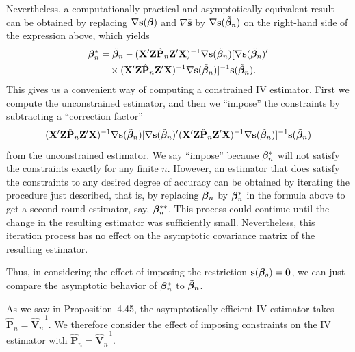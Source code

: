 Nevertheless, a computationally practical and asymptotically equivalent
result can be obtained by replacing $\nabla \mathbf{s}(\boldsymbol{\beta})$ and $\nabla \bar{\mathbf{s}}$ by $\nabla \mathbf{s}(\tilde{\boldsymbol{\beta}}_n)$ on the right-hand side of the expression above, which yields
\begin{align*}
\boldsymbol{\beta}_n^* &= \tilde{\boldsymbol{\beta}}_n - (\mathbf{X}'\mathbf{Z}\hat{\mathbf{P}}_n\mathbf{Z}'\mathbf{X})^{-1}\nabla \mathbf{s}(\tilde{\boldsymbol{\beta}}_n)[\nabla \mathbf{s}(\tilde{\boldsymbol{\beta}}_n)' \\
&\quad\times(\mathbf{X}'\mathbf{Z}\hat{\mathbf{P}}_n\mathbf{Z}'\mathbf{X})^{-1}\nabla \mathbf{s}(\tilde{\boldsymbol{\beta}}_n)]^{-1}\mathbf{s}(\tilde{\boldsymbol{\beta}}_n).
\end{align*}
This gives us a convenient way of computing a constrained IV estimator.
First we compute the unconstrained estimator, and then we ``impose'' the
constraints by subtracting a ``correction factor''
\[
(\mathbf{X}'\mathbf{Z}\hat{\mathbf{P}}_n\mathbf{Z}'\mathbf{X})^{-1}\nabla \mathbf{s}(\tilde{\boldsymbol{\beta}}_n)[\nabla \mathbf{s}(\tilde{\boldsymbol{\beta}}_n)'(\mathbf{X}'\mathbf{Z}\hat{\mathbf{P}}_n\mathbf{Z}'\mathbf{X})^{-1}\nabla \mathbf{s}(\tilde{\boldsymbol{\beta}}_n)]^{-1}\mathbf{s}(\tilde{\boldsymbol{\beta}}_n)
\]
from the unconstrained estimator. We say ``impose'' because $\boldsymbol{\beta}_n^*$ will not
satisfy the constraints exactly for any finite $n$. However, an estimator that
does satisfy the constraints to any desired degree of accuracy can be obtained by iterating the procedure just described, that is, by replacing $\tilde{\boldsymbol{\beta}}_n$
by $\boldsymbol{\beta}_n^*$ in the formula above to get a second round estimator, say, $\boldsymbol{\beta}_n^{**}$.
This process could continue until the change in the resulting estimator was
sufficiently small. Nevertheless, this iteration process has no effect on the
asymptotic covariance matrix of the resulting estimator.

Thus, in considering the effect of imposing the restriction $\mathbf{s}(\boldsymbol{\beta}_o) = \mathbf{0}$, we
can just compare the asymptotic behavior of $\boldsymbol{\beta}_n^*$ to $\tilde{\boldsymbol{\beta}}_n$.

As we saw in Proposition~4.45, the asymptotically efficient IV estimator
takes $\hat{\mathbf{P}}_n = \hat{\mathbf{V}}_n^{-1}$. We therefore consider the effect of imposing constraints
on the IV estimator with $\hat{\mathbf{P}}_n = \hat{\mathbf{V}}_n^{-1}$.

